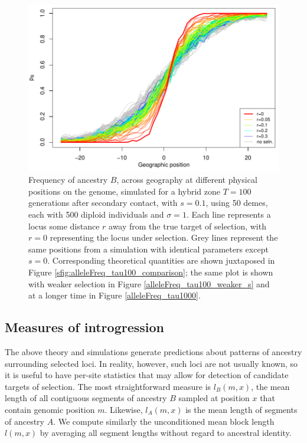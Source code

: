 \documentclass[11pt,letterpaper]{article}
\begin{document}
\begin{figure}
\includegraphics{figs/alleleFrequencies_sim}
\caption{
    Frequency of ancestry $B$,
    across geography at different physical positions on the genome, simulated for a hybrid zone
     $T=100$ generations after secondary contact, with $s=0.1$,
     using 50 demes, each with 500 diploid individuals and $\sigma=1$.
    Each line represents a locus some distance $r$ away from the true target of selection, 
    with $r=0$ representing the locus under selection. 
    Grey lines represent the same positions from a simulation with
    identical parameters except $s=0$.
    Corresponding theoretical quantities are shown juxtaposed in Figure \ref{sfig:alleleFreq_tau100_comparison};
    the same plot is shown with weaker selection in Figure \ref{alleleFreq_tau100_weaker_s} and at a longer time in Figure \ref{alleleFreq_tau1000}.
}\label{alleleFreq_tau100}
\end{figure}

\subsection*{Measures of introgression}


The above theory and simulations generate predictions about patterns of ancestry surrounding selected loci. 
In reality, however, such loci are not usually known, so it is useful to have per-site statistics that may allow for detection of candidate targets of selection. 
The most straightforward measure is $l_B(m,x)$,  
the mean length of all contiguous segments of ancestry $B$ sampled at position $x$ that contain genomic position $m$.
Likewise, $l_A(m,x)$ is the mean length of segments of ancestry $A$.
We compute similarly the unconditioned mean block length $l(m,x)$
by averaging all segment lengths without regard to ancestral identity.
\end{document}
